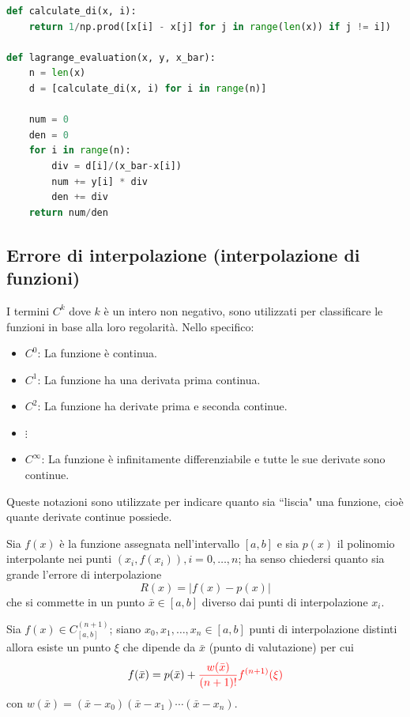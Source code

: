 \documentclass{article}
\begin{document}
\begin{lstlisting}[language=Python]
def calculate_di(x, i):
    return 1/np.prod([x[i] - x[j] for j in range(len(x)) if j != i])

def lagrange_evaluation(x, y, x_bar):
    n = len(x)
    d = [calculate_di(x, i) for i in range(n)]
    
    num = 0
    den = 0
    for i in range(n):
        div = d[i]/(x_bar-x[i])
        num += y[i] * div
        den += div
    return num/den
\end{lstlisting}
\subsection{Errore di interpolazione (interpolazione di funzioni)}
\begin{recap}
    I termini \( C^k \) dove \( k \) è un intero non negativo, sono utilizzati per classificare le funzioni in base alla loro regolarità. Nello specifico:
    \begin{itemize}
        \item \( C^0 \): La funzione è continua.
        \item \( C^1 \): La funzione ha una derivata prima continua.
        \item \( C^2 \): La funzione ha derivate prima e seconda continue.
        \item \( \vdots \)
        \item \( C^\infty \): La funzione è infinitamente differenziabile e tutte le sue derivate sono continue.
    \end{itemize}
    Queste notazioni sono utilizzate per indicare quanto sia ``liscia" una funzione, cioè quante derivate continue possiede.
\end{recap}
Sia $f(x)$ è la funzione assegnata nell'intervallo $[a,b]$ e sia $p(x)$ il
polinomio interpolante nei punti $(x_i,f(x_i)),i=0,\ldots,n$; ha senso chiedersi quanto sia grande l'errore di
interpolazione
$$R(x)=\left\lvert f(x)-p(x)\right\rvert$$
che si commette in un punto $\bar{x}\in[a,b]$ diverso dai punti di
interpolazione $x_i$.
\begin{theorem}
    Sia $f(x)\in C_{[a,b]}^{(n+1)}$; siano $x_0,x_1,\ldots,x_n\in[a,b]$ punti
    di interpolazione distinti allora esiste un punto $\xi$ che dipende da
    $\bar{x}$ (punto di valutazione) per cui 
    $$f(\bar{x})=p(\bar{x})+{\color{red}\frac{w(\bar{x})}{(n+1)!}f^{(n+1)}(\xi)}$$
    con $w(\bar{x})=(\bar{x}-x_0)(\bar{x}-x_1)\cdots(\bar{x}-x_n)$.
\end{theorem}
\end{document}
